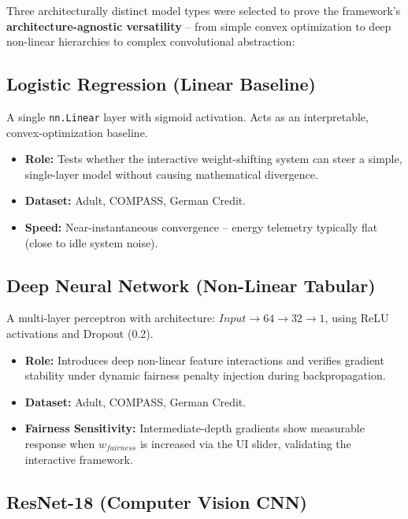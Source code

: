 \documentclass[12pt,a4paper]{article}
\begin{document}
Three architecturally distinct model types were selected to prove the framework's \textbf{architecture-agnostic versatility} -- from simple convex optimization to deep non-linear hierarchies to complex convolutional abstraction:

\subsection{Logistic Regression (Linear Baseline)}

A single \texttt{nn.Linear} layer with sigmoid activation. Acts as an interpretable, convex-optimization baseline.

\begin{itemize}
    \item \textbf{Role:} Tests whether the interactive weight-shifting system can steer a simple, single-layer model without causing mathematical divergence.
    \item \textbf{Dataset:} Adult, COMPASS, German Credit.
    \item \textbf{Speed:} Near-instantaneous convergence -- energy telemetry typically flat (close to idle system noise).
\end{itemize}

\subsection{Deep Neural Network (Non-Linear Tabular)}

A multi-layer perceptron with architecture: $Input \rightarrow 64 \rightarrow 32 \rightarrow 1$, using ReLU activations and Dropout (0.2).

\begin{itemize}
    \item \textbf{Role:} Introduces deep non-linear feature interactions and verifies gradient stability under dynamic fairness penalty injection during backpropagation.
    \item \textbf{Dataset:} Adult, COMPASS, German Credit.
    \item \textbf{Fairness Sensitivity:} Intermediate-depth gradients show measurable response when $w_{fairness}$ is increased via the UI slider, validating the interactive framework.
\end{itemize}

\subsection{ResNet-18 (Computer Vision CNN)}
\end{document}
